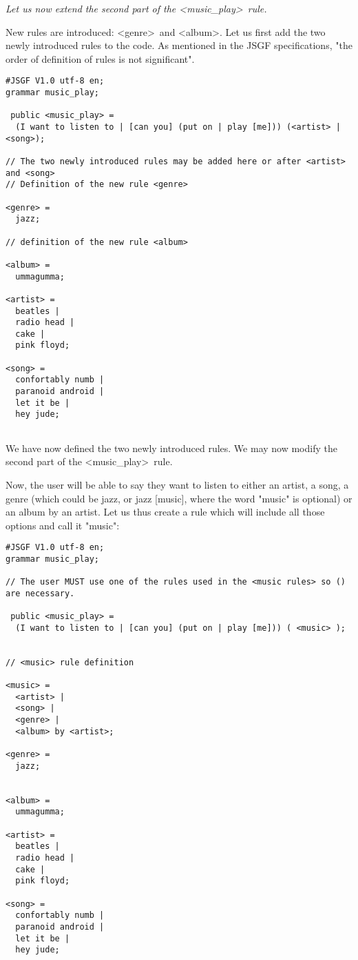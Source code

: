 \documentclass[12pt, a4paper]{article}
\begin{document}
\emph{Let us now extend the second part of the \textless music\_play\textgreater\ rule. }

New rules are introduced: \textless genre\textgreater\ and \textless album\textgreater. Let us first add the two newly introduced rules to the code. As mentioned in the JSGF specifications, "the order of definition of rules is not significant".

\begin{lstlisting}
#JSGF V1.0 utf-8 en;
grammar music_play;

 public <music_play> =
  (I want to listen to | [can you] (put on | play [me])) (<artist> | <song>);

// The two newly introduced rules may be added here or after <artist> and <song>
// Definition of the new rule <genre>

<genre> = 
  jazz;
  
// definition of the new rule <album>

<album> = 
  ummagumma;

<artist> =
  beatles |
  radio head |
  cake |
  pink floyd;
  
<song> =
  confortably numb |
  paranoid android |
  let it be |
  hey jude;
  
\end{lstlisting}

We have now defined the two newly introduced rules. We may now modify the second part of the \textless music\_play\textgreater\ rule.

Now, the user will be able to say they want to listen to either an artist, a song, a genre (which could be jazz, or jazz [music], where the word "music" is optional) or an album by an artist. Let us thus create a rule which will include all those options and call it "music":

\begin{lstlisting}
#JSGF V1.0 utf-8 en;
grammar music_play;

// The user MUST use one of the rules used in the <music rules> so () are necessary.

 public <music_play> =
  (I want to listen to | [can you] (put on | play [me])) ( <music> );
  

// <music> rule definition

<music> = 
  <artist> |
  <song> | 
  <genre> | 
  <album> by <artist>;

<genre> = 
  jazz;


<album> = 
  ummagumma;

<artist> =
  beatles |
  radio head |
  cake |
  pink floyd;
  
<song> =
  confortably numb |
  paranoid android |
  let it be |
  hey jude;
  
\end{lstlisting}
\end{document}

